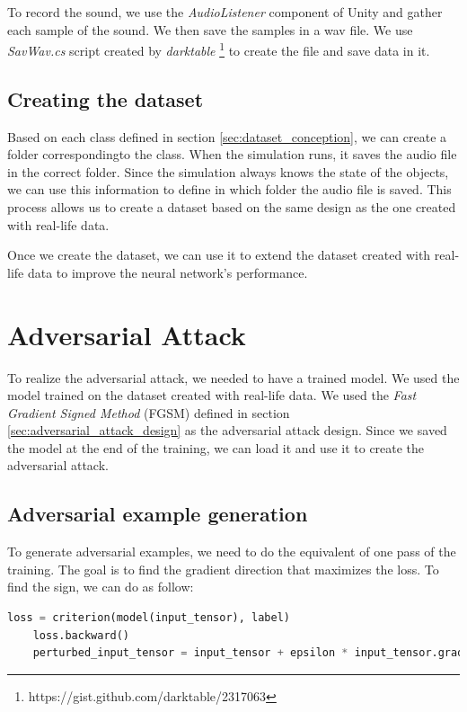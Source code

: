 To record the sound, we use the \textit{AudioListener} component of Unity and gather each sample of the sound. We then save the samples in a wav file. We use \textit{SavWav.cs} script created by \textit{darktable} \footnote{https://gist.github.com/darktable/2317063} to create the file and save data in it.

\subsection{Creating the dataset}

Based on each class defined in section \ref{sec:dataset_conception}, we can create a folder correspondingto the class. When the simulation runs, it saves the audio file in the correct folder. Since the simulation always knows the state of the objects, we can use this information to define in which folder the audio file is saved. This process allows us to create a dataset based on the same design as the one created with real-life data.

Once we create the dataset, we can use it to extend the dataset created with real-life data to improve the neural network's performance.

\section{Adversarial Attack}

To realize the adversarial attack, we needed to have a trained model. We used the model trained on the dataset created with real-life data. We used the \textit{Fast Gradient Signed Method} (FGSM) defined in section \ref{sec:adversarial_attack_design} as the adversarial attack design. Since we saved the model at the end of the training, we can load it and use it to create the adversarial attack.

\subsection{Adversarial example generation}

To generate adversarial examples, we need to do the equivalent of one pass of the training. The goal is to find the gradient direction that maximizes the loss. To find the sign, we can do as follow:

\begin{lstlisting}[language=Python]
    loss = criterion(model(input_tensor), label)
    loss.backward()
    perturbed_input_tensor = input_tensor + epsilon * input_tensor.grad.sign()
\end{lstlisting}

